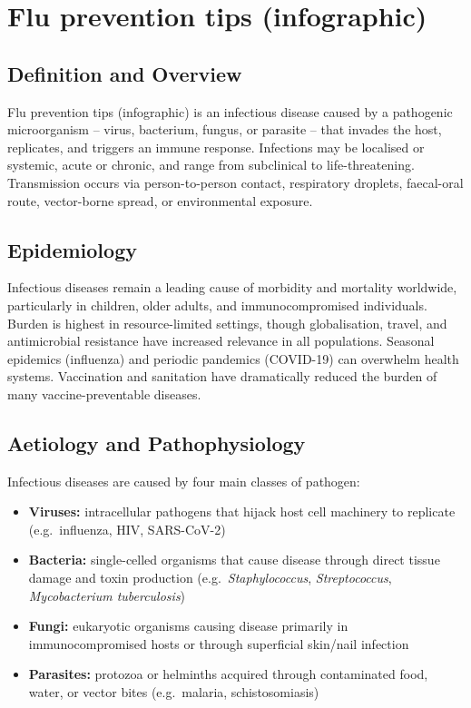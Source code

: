 \chapter{Flu prevention tips (infographic)}

\section*{Definition and Overview}
Flu prevention tips (infographic) is an infectious disease caused by a pathogenic microorganism -- virus, bacterium, fungus, or parasite -- that invades the host, replicates, and triggers an immune response. Infections may be localised or systemic, acute or chronic, and range from subclinical to life-threatening. Transmission occurs via person-to-person contact, respiratory droplets, faecal-oral route, vector-borne spread, or environmental exposure.

\section*{Epidemiology}
Infectious diseases remain a leading cause of morbidity and mortality worldwide, particularly in children, older adults, and immunocompromised individuals. Burden is highest in resource-limited settings, though globalisation, travel, and antimicrobial resistance have increased relevance in all populations. Seasonal epidemics (influenza) and periodic pandemics (COVID-19) can overwhelm health systems. Vaccination and sanitation have dramatically reduced the burden of many vaccine-preventable diseases.

\section*{Aetiology and Pathophysiology}
Infectious diseases are caused by four main classes of pathogen:

\begin{itemize}
    \item \textbf{Viruses:} intracellular pathogens that hijack host cell machinery to replicate (e.g.\ influenza, HIV, SARS-CoV-2)
    \item \textbf{Bacteria:} single-celled organisms that cause disease through direct tissue damage and toxin production (e.g.\ \textit{Staphylococcus}, \textit{Streptococcus}, \textit{Mycobacterium tuberculosis})
    \item \textbf{Fungi:} eukaryotic organisms causing disease primarily in immunocompromised hosts or through superficial skin/nail infection
    \item \textbf{Parasites:} protozoa or helminths acquired through contaminated food, water, or vector bites (e.g.\ malaria, schistosomiasis)
\end{itemize}

